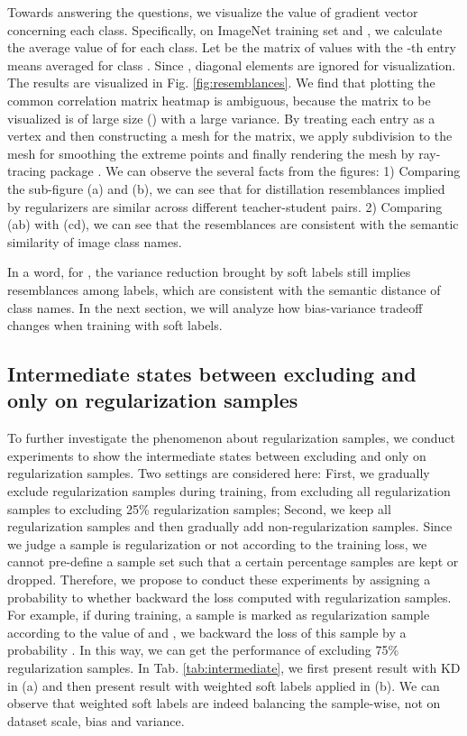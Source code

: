 \documentclass{article} \usepackage{iclr2021_conference,times}
\newcommand\revise[1]{#1}
\begin{document}
Towards answering the questions, we visualize the value of gradient vector  concerning each class. Specifically, on ImageNet \citep{deng2009imagenet} training set and , we calculate the average value of  for each class. 
Let  be the matrix of values with the -th entry  means averaged  for class . Since , diagonal elements are ignored for visualization. The results are visualized in Fig. \ref{fig:resemblances}. We find that plotting the common correlation matrix heatmap is ambiguous, because the matrix to be visualized is of large size () with a large variance. By treating each entry  as a vertex and then constructing a mesh for the matrix, we apply subdivision \citep{loop1987smooth} to the mesh for smoothing the extreme points and finally rendering the mesh by ray-tracing package \citet{plotopti19}. We can observe the several facts from the figures: 1) Comparing the sub-figure (a) and (b), we can see that for distillation resemblances implied by regularizers are similar across different teacher-student pairs. 2)  Comparing (ab) with (cd), we can see that the resemblances are consistent with the semantic similarity of image class names. 

In a word, for , the variance reduction brought by soft labels still implies resemblances among labels, which are consistent with the semantic distance of class names.
In the next section, we will analyze how bias-variance tradeoff changes when training with soft labels.

\revise{
\subsection{Intermediate states between excluding and only on regularization samples}
To further investigate the phenomenon about regularization samples, we conduct experiments to show the intermediate states between excluding and only on regularization samples. Two settings are considered here: First, we gradually exclude regularization samples during training, from excluding all regularization samples to excluding 25\% regularization samples; Second, we keep all regularization samples and then gradually add non-regularization samples. Since we judge a sample is regularization or not according to the training loss, we cannot pre-define a sample set such that a certain percentage samples are kept or dropped. 
Therefore, we propose to conduct these experiments by assigning a probability to whether backward the loss computed with regularization samples. For example, if during training, a sample is marked as regularization sample according to the value of  and , we backward the loss of this sample by a probability . In this way, we can get the performance of excluding 75\% regularization samples. In Tab. \ref{tab:intermediate}, we first present result with KD in (a) and then present result with weighted soft labels applied in (b). We can observe that weighted soft labels are indeed balancing the sample-wise, not on dataset scale, bias and variance.
}
\end{document}
